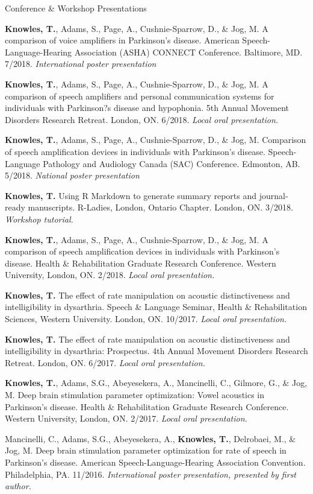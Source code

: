 \documentclass{resume} %
\begin{document}
\begin{rSection}{Conference \& Workshop Presentations}
	
	{\bf Knowles, T.}, Adams, S., Page, A., Cushnie-Sparrow, D., \& Jog, M. A comparison of voice amplifiers in Parkinson's disease. American Speech-Language-Hearing Association (ASHA) CONNECT Conference. Baltimore, MD. 7/2018. \emph{International poster presentation}
	
	{\bf Knowles, T.}, Adams, S., Page, A., Cushnie-Sparrow, D., \& Jog, M. A comparison of speech amplifiers and personal communication systems for individuals with Parkinson?s disease and hypophonia. 5th Annual Movement Disorders Research Retreat. London, ON. 6/2018. \emph{Local oral presentation.}

	{\bf Knowles, T.}, Adams, S., Page, A., Cushnie-Sparrow, D., \& Jog, M. Comparison of speech amplification devices in individuals with Parkinson's disease. Speech-Language Pathology and Audiology Canada (SAC) Conference. Edmonton, AB. 5/2018. \emph{National poster presentation} 

	{\bf Knowles, T.} Using R Markdown to generate summary reports and journal-ready manuscripts. R-Ladies, London, Ontario Chapter. London, ON. 3/2018. \emph{Workshop tutorial.}
	
	{\bf Knowles, T.}, Adams, S., Page, A., Cushnie-Sparrow, D., \& Jog, M. A comparison of speech amplification devices in individuals with Parkinson's disease. Health \& Rehabilitation  Graduate Research Conference. Western University, London, ON. 2/2018. \emph{Local oral presentation.}
	
	{\bf Knowles, T.} The effect of rate manipulation on acoustic distinctiveness and intelligibility in dysarthria. Speech \& Language Seminar, Health \& Rehabilitation Sciences, Western University. London, ON. 10/2017. \emph{Local oral presentation.}
	
	{\bf Knowles, T.} The effect of rate manipulation on acoustic distinctiveness and intelligibility in dysarthria: Prospectus. 4th Annual Movement Disorders Research Retreat. London, ON. 6/2017. \emph{Local oral presentation.}
	
	{\bf Knowles, T.}, Adams, S.G., Abeyesekera, A., Mancinelli, C., Gilmore, G., \& Jog, M. Deep brain stimulation parameter optimization: Vowel acoustics in Parkinson's disease. Health \& Rehabilitation Graduate Research Conference. Western University, London, ON. 2/2017. \emph{Local oral presentation.}
	
	Mancinelli, C., Adams, S.G., Abeyesekera, A., {\bf Knowles, T.}, Delrobaei, M., \& Jog, M. Deep brain stimulation parameter optimization for rate of speech in Parkinson's disease. American Speech-Language-Hearing Association Convention. Philadelphia, PA. 11/2016. \emph{International poster presentation, presented by first author.}
	

\end{rSection}
\end{document}
